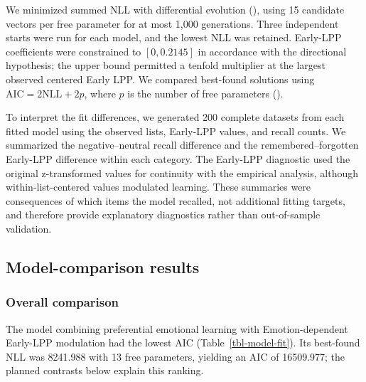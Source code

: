 \documentclass[
  man,
  longtable,
  nolmodern,
  notxfonts,
  notimes,
  draftfirst,
  colorlinks=true,linkcolor=blue,citecolor=blue,urlcolor=blue]{apa7}
\begin{document}
We minimized summed NLL with differential evolution
(), using 15
candidate vectors per free parameter for at most 1,000 generations.
Three independent starts were run for each model, and the lowest NLL was
retained. Early-LPP coefficients were constrained to \([0,0.2145]\) in
accordance with the directional hypothesis; the upper bound permitted a
tenfold multiplier at the largest observed centered Early LPP. We
compared best-found solutions using \(\mathrm{AIC}=2\mathrm{NLL}+2p\),
where \(p\) is the number of free parameters
().

To interpret the fit differences, we generated 200 complete datasets
from each fitted model using the observed lists, Early-LPP values, and
recall counts. We summarized the negative--neutral recall difference and
the remembered--forgotten Early-LPP difference within each category. The
Early-LPP diagnostic used the original z-transformed values for
continuity with the empirical analysis, although within-list-centered
values modulated learning. These summaries were consequences of which
items the model recalled, not additional fitting targets, and therefore
provide explanatory diagnostics rather than out-of-sample validation.

\subsection{Model-comparison results}\label{model-comparison-results}

\subsubsection{Overall comparison}\label{overall-comparison}

The model combining preferential emotional learning with
Emotion-dependent Early-LPP modulation had the lowest AIC
(Table~\ref{tbl-model-fit}). Its best-found NLL was 8241.988 with 13
free parameters, yielding an AIC of 16509.977; the planned contrasts
below explain this ranking.
\end{document}
